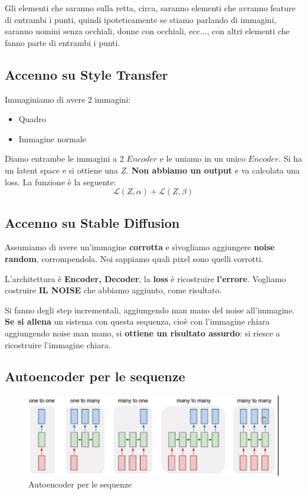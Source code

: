Gli elementi che saranno sulla retta, circa, saranno elementi che avranno
feature di entrambi i punti, quindi ipoteticamente se stiamo parlando di
immagini, saranno uomini senza occhiali, donne con occhiali, ecc..., con altri
elementi che fanno parte di entrambi i punti.

\subsection{Accenno su Style Transfer}

Immaginiamo di avere 2 immagini:
\begin{itemize}
    \item Quadro
    \item Immagine normale
\end{itemize}

Diamo entrambe le immagini a 2 $Encoder$ e le uniamo in un unico $Encoder$. Si
ha un latent space e si ottiene una $Z$. \textbf{Non abbiamo un output} e va
calcolata una loss. La funzione è la seguente:
\[
    \mathcal{L}(Z, \alpha) + \mathcal{L}(Z, \beta)
\]

\subsection{Accenno su Stable Diffusion}

Assumiamo di avere un'immagine \textbf{corrotta} e sìvogliamo aggiungere
\textbf{noise random}, corrompendola. Noi sappiamo quali pixel sono quelli
corrotti.

L'architettura è \textbf{Encoder, Decoder}, la \textbf{loss} è ricostruire
\textbf{l'errore}. Vogliamo costruire \textbf{IL NOISE} che abbiamo aggiunto,
come risultato.

Si fanno degli step incrementali, aggiungendo man mano del noise all'immagine.
\textbf{Se si allena} un sistema con questa sequenza, cioè con l'immagine
chiara aggiungendo noise man mano, si \textbf{ottiene un risultato assurdo}: si
riesce a ricostruire l'immagine chiara.

\subsection{Autoencoder per le sequenze}

\begin{figure}[H]
    \centering
    \includegraphics[width=0.8\linewidth]{images/archRNN.png}
    \caption{Autoencoder per le sequenze}
    \label{fig:seq}
\end{figure}

